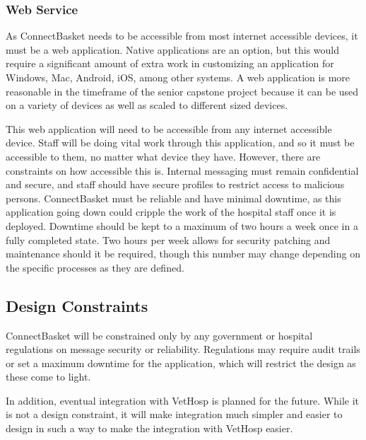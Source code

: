\documentclass[onecolumn, draftclsnofoot,10pt, compsoc]{IEEEtran}
\begin{document}
\subsubsection{Web Service}
As ConnectBasket needs to be accessible from most internet accessible devices, it must be a web application. Native applications are an option, but this would require a significant amount of extra work in customizing an application for Windows, Mac, Android, iOS, among other systems. A web application is more reasonable in the timeframe of the senior capstone project because it can be used on a variety of devices as well as scaled to different sized devices.

This web application will need to be accessible from any internet accessible device. Staff will be doing vital work through this application, and so it must be accessible to them, no matter what device they have. However, there are constraints on how accessible this is. Internal messaging must remain confidential and secure, and staff should have secure profiles to restrict access to malicious persons. ConnectBasket must be reliable and have minimal downtime, as this application going down could cripple the work of the hospital staff once it is deployed. Downtime should be kept to a maximum of two hours a week once in a fully completed state. Two hours per week allows for security patching and maintenance should it be required, though this number may change depending on the specific processes as they are defined.

\subsection{Design Constraints}
ConnectBasket will be constrained only by any government or hospital regulations on message security or reliability. Regulations may require audit trails or set a maximum downtime for the application, which will restrict the design as these come to light.

In addition, eventual integration with VetHosp is planned for the future. While it is not a design constraint, it will make integration much simpler and easier to design in such a way to make the integration with VetHosp easier.
\end{document}
